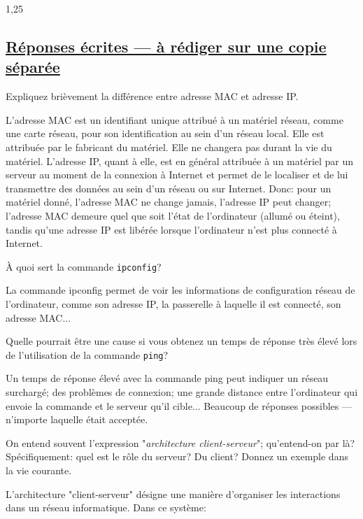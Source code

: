 \documentclass[11pt,a4paper]{exam}
\begin{document}
\begin{spacing}{1,25}
\begin{questions}
\begin{parts}
				\part{\underline{Réponses écrites --- à rédiger sur une copie séparée}}
				\begin{subparts}
					\subpart[2]Expliquez brièvement la différence entre adresse MAC et adresse IP.
					\begin{solution}
						L'adresse MAC est un identifiant unique attribué à un matériel réseau, comme une carte réseau, pour son identification au sein d'un réseau local. Elle est attribuée par le fabricant du matériel. Elle ne changera pas durant la vie du matériel.
						L'adresse IP, quant à elle, est en général attribuée à un matériel par un serveur au moment de la connexion à Internet et permet de le localiser et de lui transmettre des données au sein d'un réseau ou sur Internet.
						Donc: pour un matériel donné, l'adresse MAC ne change jamais, l'adresse IP peut changer; l'adresse MAC demeure quel que soit l'état de l'ordinateur (allumé ou éteint), tandis qu'une adresse IP est libérée lorsque l'ordinateur n'est plus connecté à Internet.
					\end{solution}
					\subpart[2] À quoi sert la commande \texttt{ipconfig}?
					\begin{solution}
						La commande ipconfig permet de voir les informations de configuration réseau de l'ordinateur, comme son adresse IP, la passerelle à laquelle il est connecté, son adresse MAC...
					\end{solution}
					\subpart[2] Quelle pourrait être une cause si vous obtenez un temps de réponse très élevé lors de l'utilisation de la commande \texttt{ping}?
					\begin{solution}
						Un temps de réponse élevé avec la commande ping peut indiquer un réseau surchargé; des problèmes de connexion; une grande distance entre l'ordinateur qui envoie la commande et le serveur qu'il cible... Beaucoup de réponses possibles --- n'importe laquelle était acceptée.
					\end{solution}
					\subpart[2] On entend souvent l'expression "\textit{architecture client-serveur}"; qu'entend-on par là? Spécifiquement: quel est le rôle du serveur? Du client? Donnez un exemple dans la vie courante.
					\begin{solution}
						L'architecture "client-serveur" désigne une manière d'organiser les interactions dans un réseau informatique. Dans ce système:
						\begin{itemize}

\end{itemize}
\end{solution}
\end{subparts}
\end{parts}
\end{questions}
\end{spacing}
\end{document}
